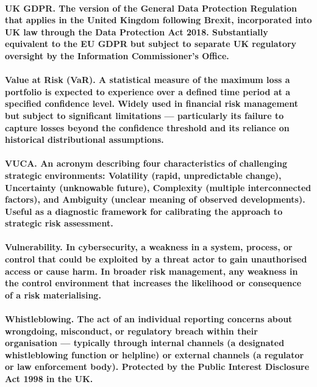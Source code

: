 \paragraph{\textbf{UK GDPR}. The version of the General Data Protection Regulation that applies in the United Kingdom following Brexit, incorporated into UK law through the Data Protection Act 2018. Substantially equivalent to the EU GDPR but subject to separate UK regulatory oversight by the Information Commissioner's Office.}

\paragraph{\textbf{Value at Risk (VaR)}. A statistical measure of the maximum loss a portfolio is expected to experience over a defined time period at a specified confidence level. Widely used in financial risk management but subject to significant limitations — particularly its failure to capture losses beyond the confidence threshold and its reliance on historical distributional assumptions.}

\paragraph{\textbf{VUCA}. An acronym describing four characteristics of challenging strategic environments: Volatility (rapid, unpredictable change), Uncertainty (unknowable future), Complexity (multiple interconnected factors), and Ambiguity (unclear meaning of observed developments). Useful as a diagnostic framework for calibrating the approach to strategic risk assessment.}

\paragraph{\textbf{Vulnerability}. In cybersecurity, a weakness in a system, process, or control that could be exploited by a threat actor to gain unauthorised access or cause harm. In broader risk management, any weakness in the control environment that increases the likelihood or consequence of a risk materialising.}

\paragraph{\textbf{Whistleblowing}. The act of an individual reporting concerns about wrongdoing, misconduct, or regulatory breach within their organisation — typically through internal channels (a designated whistleblowing function or helpline) or external channels (a regulator or law enforcement body). Protected by the Public Interest Disclosure Act 1998 in the UK.}